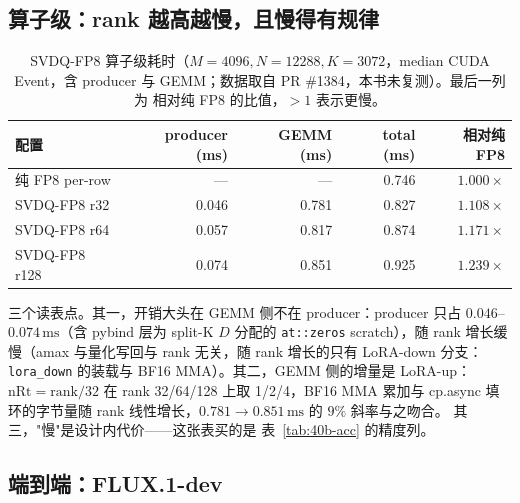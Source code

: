 \subsection{算子级：rank 越高越慢，且慢得有规律}

\begin{table}[H]
\centering\small
\caption{SVDQ-FP8 算子级耗时（$M{=}4096,N{=}12288,K{=}3072$，median CUDA
Event，含 producer 与 GEMM；数据取自 PR \#1384，本书未复测）。最后一列为
相对纯 FP8 的比值，$>1$ 表示更慢。}
\label{tab:40b-op}
\begin{tabular}{@{}lrrrr@{}}
\toprule
配置 & producer (ms) & GEMM (ms) & total (ms) & 相对纯 FP8 \\
\midrule
纯 FP8 per-row & --- & --- & 0.746 & $1.000\times$ \\
SVDQ-FP8 r32  & 0.046 & 0.781 & 0.827 & $1.108\times$ \\
SVDQ-FP8 r64  & 0.057 & 0.817 & 0.874 & $1.171\times$ \\
SVDQ-FP8 r128 & 0.074 & 0.851 & 0.925 & $1.239\times$ \\
\bottomrule
\end{tabular}
\end{table}

三个读表点。其一，开销大头在 GEMM 侧不在 producer：producer 只占
$0.046$--$0.074\,\mathrm{ms}$（含 pybind 层为 split-K $D$ 分配的
\texttt{at::zeros} scratch），随 rank 增长缓慢（amax 与量化写回与 rank
无关，随 rank 增长的只有 LoRA-down 分支：\texttt{lora\_down} 的装载与
BF16 MMA）。其二，GEMM 侧的增量是 LoRA-up：$\mathrm{nRt}=\mathrm{rank}/32$
在 rank 32/64/128 上取 1/2/4，BF16 MMA 累加与 cp.async 填环的字节量随
rank 线性增长，$0.781\to0.851\,\mathrm{ms}$ 的 $9\%$ 斜率与之吻合。
其三，"慢"是设计内代价——这张表买的是
表~\ref{tab:40b-acc} 的精度列。

\subsection{端到端：FLUX.1-dev}

